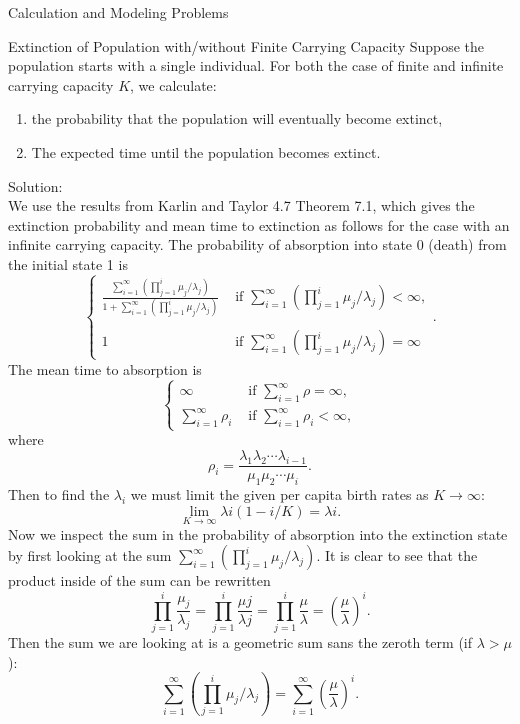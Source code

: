 \documentclass[12pt]{article}
\numberwithin{equation}{section}
\begin{document}
\begin{section}{Calculation and Modeling Problems}
\begin{subsection}{Extinction of Population with/without Finite Carrying Capacity}
    Suppose the population starts with a single individual. For both the case of finite and infinite carrying capacity $K$, we calculate:\\
    \begin{enumerate}
        \item the probability that the population will eventually become extinct,
        \item The expected time until the population becomes extinct.
    \end{enumerate}
    Solution:\\

    We use the results from Karlin and Taylor 4.7 Theorem 7.1, which gives the extinction probability and mean time to extinction as follows for the case with an infinite carrying capacity. The probability of absorption into state 0 (death) from the initial state 1 is
    $$\left\{\begin{array}{cc}\frac{\sum_{i=1}^\infty\left(\prod_{j=1}^i \mu_j/ \lambda_j\right)}{1+\sum_{i=1}^\infty\left(\prod_{j=1}^i\mu_j/ \lambda_j\right)}& \text{ if }\sum_{i=1}^\infty\left(\prod_{j=1}^i \mu_j/\lambda_j\right) < \infty,\\
    \\
    1&\text{ if }\sum_{i=1}^\infty\left(\prod_{j=1}^i \mu_j/\lambda_j\right)=\infty\end{array}\right..$$
    The mean time to absorption is
    $$\left\{\begin{array}{cc}\infty &\text{ if }\sum_{i=1}^\infty\rho=\infty,\\
    \sum_{i=1}^\infty\rho_i& \text{ if }\sum_{i=1}^\infty \rho_i<\infty,\end{array}\right.$$
    where
    $$\rho_i=\frac{\lambda_1\lambda_2 \cdots \lambda_{i-1}}{\mu_1\mu_2\cdots\mu_i}.$$
    Then to find the $\lambda_i$ we must limit the given per capita birth rates as $K\to\infty$:
    $$\lim_{K\to\infty}\lambda i(1-i/K)=\lambda i.$$
    Now we inspect the sum in the probability of absorption into the extinction state by first looking at the sum $\sum_{i=1}^\infty\left(\prod_{j=1}^i \mu_j/\lambda_j\right)$. It is clear to see that the product inside of the sum can be rewritten
    $$\prod_{j=1}^i\frac{\mu_j}{\lambda_j}=\prod_{j=1}^i\frac{\mu j}{\lambda j}=\prod_{j=1}^i\frac{\mu}{\lambda}=\left(\frac{\mu}{\lambda}\right)^i.$$
    Then the sum we are looking at is a geometric sum sans the zeroth term (if $\lambda>\mu$):
    $$\sum_{i=1}^\infty\left(\prod_{j=1}^i \mu_j/\lambda_j\right)=\sum_{i=1}^\infty\left(\frac{\mu}{\lambda}\right)^i.$$

\end{subsection}
\end{section}
\end{document}
